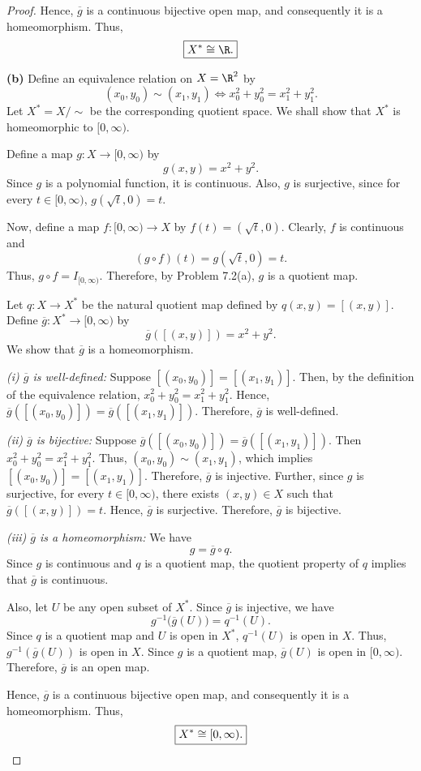 \begin{proof}
Hence, $\overline g$ is a continuous bijective open map, and consequently it is a homeomorphism.
Thus,
\[ \boxed{X^*\cong\R.} \]

\medskip
\textbf{(b)} Define an equivalence relation on $X=\R^2$ by
\[ (x_0,y_0)\sim(x_1,y_1)\iff x_0^2+y_0^2=x_1^2+y_1^2. \]
Let $X^*=X/{\sim}$ be the corresponding quotient space. We shall show that $X^*$ is
homeomorphic to $[0,\infty)$.

Define a map $g\colon X\to[0,\infty)$ by
\[ g(x,y)=x^2+y^2. \]
Since $g$ is a polynomial function, it is continuous. Also, $g$ is surjective, since for every
$t\in[0,\infty)$, $g(\sqrt t,0)=t$.

Now, define a map $f\colon[0,\infty)\to X$ by $f(t)=(\sqrt t,0)$. Clearly, $f$ is continuous
and
\[ (g\circ f)(t)=g(\sqrt t,0)=t. \]
Thus, $g\circ f=I_{[0,\infty)}$. Therefore, by Problem 7.2(a), $g$ is a quotient map.

Let $q\colon X\to X^*$ be the natural quotient map defined by $q(x,y)=[(x,y)]$. Define
$\overline g\colon X^*\to[0,\infty)$ by
\[ \overline g([(x,y)])=x^2+y^2. \]
We show that $\overline g$ is a homeomorphism.

\textit{(i) $\overline g$ is well-defined:}
Suppose $[(x_0,y_0)]=[(x_1,y_1)]$. Then, by the definition of the equivalence relation,
$x_0^2+y_0^2=x_1^2+y_1^2$. Hence,
$\overline g([(x_0,y_0)])=\overline g([(x_1,y_1)])$. Therefore, $\overline g$ is well-defined.

\textit{(ii) $\overline g$ is bijective:}
Suppose $\overline g([(x_0,y_0)])=\overline g([(x_1,y_1)])$. Then
$x_0^2+y_0^2=x_1^2+y_1^2$. Thus, $(x_0,y_0)\sim(x_1,y_1)$, which implies
$[(x_0,y_0)]=[(x_1,y_1)]$. Therefore, $\overline g$ is injective. Further, since $g$ is
surjective, for every $t\in[0,\infty)$, there exists $(x,y)\in X$ such that
$\overline g([(x,y)])=t$. Hence, $\overline g$ is surjective. Therefore, $\overline g$ is
bijective.

\textit{(iii) $\overline g$ is a homeomorphism:}
We have
\[ g=\overline g\circ q. \]
Since $g$ is continuous and $q$ is a quotient map, the quotient property of $q$ implies that
$\overline g$ is continuous.

Also, let $U$ be any open subset of $X^*$. Since $\overline g$ is injective, we have
\[ g^{-1}\bigl(\overline g(U)\bigr)=q^{-1}(U). \]
Since $q$ is a quotient map and $U$ is open in $X^*$, $q^{-1}(U)$ is open in $X$. Thus,
$g^{-1}(\overline g(U))$ is open in $X$. Since $g$ is a quotient map, $\overline g(U)$ is open
in $[0,\infty)$. Therefore, $\overline g$ is an open map.

Hence, $\overline g$ is a continuous bijective open map, and consequently it is a homeomorphism.
Thus,
\[ \boxed{X^*\cong[0,\infty).} \qedhere \]
\end{proof}

